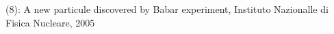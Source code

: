 \documentclass[preview]{standalone}
\begin{document}
\begin{center}
(8): A new particule discovered by Babar experiment, Instituto Nazionalle di Fisica Nucleare, 2005
\end{center}
\end{document}
